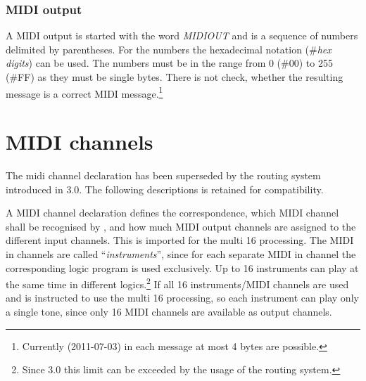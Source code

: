 \subsection{MIDI output}\label{sec:midi-ausgaben}

A MIDI output is started with the word \textit{MIDIOUT}
and is a sequence of numbers delimited by parentheses. For the numbers
the hexadecimal notation (\#\textit{hex digits}) can be used. The
numbers must be in the range from 0 (\#00) to 255 (\#FF) as they must
be single bytes. There is not check, whether the resulting message is
a correct MIDI message.\footnote{Currently (2011-07-03) in each message at most 4 bytes are possible.}

\iffalse
MIDI-Ausgaben werden mit dem Wort {\it MIDIOUT}\index{MIDIOUT}
 eingeleitet und
sind eine eingeklammerte Folge von Zahlen. Bei Zahlen ist die sedezimale
Schreibweise zulässig (\#{\it ziffern}). Die Zahlen
müssen im Bereich von 0 bis 255 liegen, also Bytes sein. Es erfolgt keine
Kontrolle, ob es sich um eine sinnvolle MIDI-Nachricht handelt.
\fi



\chapter{MIDI channels}\label{cha:midi-kanale}
\label{MIDICHANNEL}

The midi channel declaration has been superseded by the routing system
introduced in \mutabor{} 3.0. The following descriptions is retained
for compatibility.

A MIDI channel declaration defines the correspondence, which MIDI
channel shall be recognised by \mutabor{}, and how much MIDI output
channels are assigned to the different input channels. This is
imported for the multi 16 processing. The
MIDI in channels are called “\textit{instruments}”, since for each separate
MIDI in channel the corresponding logic program is used
exclusively. Up to 16 instruments can play at the same time in
different logics.\footnote{Since \mutabor{} 3.0 this limit can be
  exceeded by the usage of the routing system.} If all 16
instruments/MIDI channels are used and \mutabor{} is instructed to use
the multi 16 processing, so each instrument can play only a single
tone, since only 16 MIDI channels are available as output channels. 

